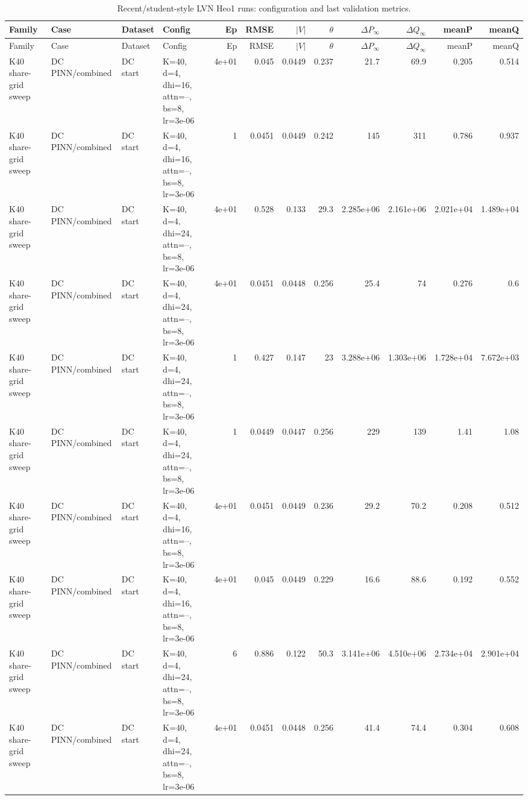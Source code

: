 \documentclass[10pt]{article}
\newcommand{\dP}{\Delta P}
\newcommand{\dQ}{\Delta Q}
\begin{document}
\begin{landscape}
\scriptsize
\begin{longtable}{p{2.1cm}p{2.1cm}p{3.1cm}p{3.5cm}rrrrrrrr}
\caption{Recent/student-style LVN Heo1 runs: configuration and last validation metrics.}\\
\toprule
Family & Case & Dataset & Config & Ep & RMSE & $|V|$ & $\theta$ & $\dP_\infty$ & $\dQ_\infty$ & meanP & meanQ \\
\midrule
\endfirsthead
\toprule
Family & Case & Dataset & Config & Ep & RMSE & $|V|$ & $\theta$ & $\dP_\infty$ & $\dQ_\infty$ & meanP & meanQ \\
\midrule
\endhead
K40 share-grid sweep & DC PINN/combined & DC start & K=40, d=4, dhi=16, attn=--, bs=8, lr=3e-06 & 4e+01 & 0.045 & 0.0449 & 0.237 & 21.7 & 69.9 & 0.205 & 0.514 \\
K40 share-grid sweep & DC PINN/combined & DC start & K=40, d=4, dhi=16, attn=--, bs=8, lr=3e-06 & 1 & 0.0451 & 0.0449 & 0.242 & 145 & 311 & 0.786 & 0.937 \\
K40 share-grid sweep & DC PINN/combined & DC start & K=40, d=4, dhi=24, attn=--, bs=8, lr=3e-06 & 4e+01 & 0.528 & 0.133 & 29.3 & 2.285e+06 & 2.161e+06 & 2.021e+04 & 1.489e+04 \\
K40 share-grid sweep & DC PINN/combined & DC start & K=40, d=4, dhi=24, attn=--, bs=8, lr=3e-06 & 4e+01 & 0.0451 & 0.0448 & 0.256 & 25.4 & 74 & 0.276 & 0.6 \\
K40 share-grid sweep & DC PINN/combined & DC start & K=40, d=4, dhi=24, attn=--, bs=8, lr=3e-06 & 1 & 0.427 & 0.147 & 23 & 3.288e+06 & 1.303e+06 & 1.728e+04 & 7.672e+03 \\
K40 share-grid sweep & DC PINN/combined & DC start & K=40, d=4, dhi=24, attn=--, bs=8, lr=3e-06 & 1 & 0.0449 & 0.0447 & 0.256 & 229 & 139 & 1.41 & 1.08 \\
K40 share-grid sweep & DC PINN/combined & DC start & K=40, d=4, dhi=16, attn=--, bs=8, lr=3e-06 & 4e+01 & 0.0451 & 0.0449 & 0.236 & 29.2 & 70.2 & 0.208 & 0.512 \\
K40 share-grid sweep & DC PINN/combined & DC start & K=40, d=4, dhi=16, attn=--, bs=8, lr=3e-06 & 4e+01 & 0.045 & 0.0449 & 0.229 & 16.6 & 88.6 & 0.192 & 0.552 \\
K40 share-grid sweep & DC PINN/combined & DC start & K=40, d=4, dhi=24, attn=--, bs=8, lr=3e-06 & 6 & 0.886 & 0.122 & 50.3 & 3.141e+06 & 4.510e+06 & 2.734e+04 & 2.901e+04 \\
K40 share-grid sweep & DC PINN/combined & DC start & K=40, d=4, dhi=24, attn=--, bs=8, lr=3e-06 & 4e+01 & 0.0451 & 0.0448 & 0.256 & 41.4 & 74.4 & 0.304 & 0.608 \\

\end{longtable}
\end{landscape}
\end{document}
